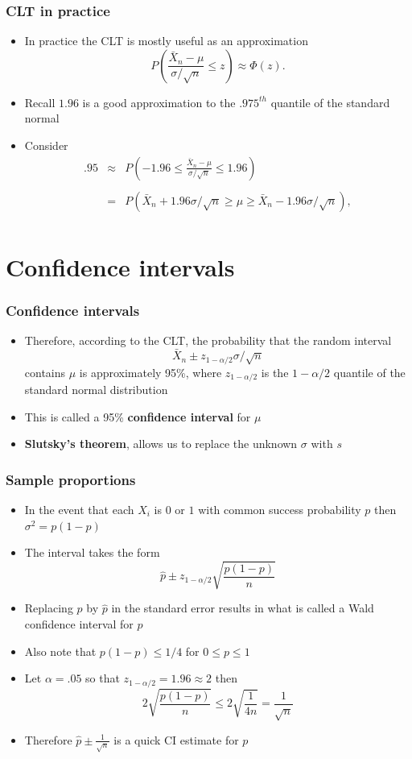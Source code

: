 \documentclass[aspectratio=169]{beamer}
\begin{document}
\begin{frame}\frametitle{CLT in practice}
  \begin{itemize}
  \item In practice the CLT is mostly useful as an approximation
    $$
    P\left( \frac{\bar X_n - \mu}{\sigma / \sqrt{n}} \leq z \right) \approx \Phi(z).  
    $$
  \item Recall $1.96$ is a good approximation to the $.975^{th}$
    quantile of the standard normal
  \item Consider
    \begin{eqnarray*}
      .95 & \approx & P\left( -1.96 \leq \frac{\bar X_n - \mu}{\sigma / \sqrt{n}} \leq 1.96 \right)\\ \\
      & =       & P\left(\bar X_n +1.96 \sigma/\sqrt{n} \geq \mu \geq \bar X_n - 1.96\sigma/\sqrt{n} \right),\\
    \end{eqnarray*}
  \end{itemize}
\end{frame}

\section{Confidence intervals}
\begin{frame}\frametitle{Confidence intervals}
  \begin{itemize}
  \item Therefore, according to the CLT, the probability that the random
    interval $$\bar X_n \pm z_{1-\alpha/2}\sigma / \sqrt{n}$$ contains $\mu$ is
    approximately 95\%, where $z_{1-\alpha/2}$ is the $1-\alpha/2$ quantile of the
    standard normal distribution
  \item This is called a 95\% {\bf confidence interval} for $\mu$
  \item {\bf Slutsky's theorem}, allows us to replace the unknown $\sigma$ with $s$
  \end{itemize}
\end{frame}

\begin{frame}\frametitle{Sample proportions}
  \begin{itemize}
  \item In the event that each $X_i$ is $0$ or $1$ with common success probability $p$
    then $\sigma^2 = p(1 - p)$
  \item The interval takes the form
    $$
    \hat p \pm z_{1 - \alpha/2}  \sqrt{\frac{p(1 - p)}{n}}
    $$
  \item Replacing $p$ by $\hat p$ in the standard error results in what is called a Wald confidence
    interval for $p$
  \item Also note that $p(1-p) \leq 1/4$ for $0 \leq p \leq 1$
  \item Let $\alpha = .05$ so that $z_{1 -\alpha/2} = 1.96 \approx 2$ then
    $$
    2  \sqrt{\frac{p(1 - p)}{n}} \leq 2 \sqrt{\frac{1}{4n}} = \frac{1}{\sqrt{n}} 
    $$
  \item Therefore $\hat p \pm \frac{1}{\sqrt{n}}$ is a quick CI estimate for $p$
  \end{itemize}
\end{frame}
\end{document}
